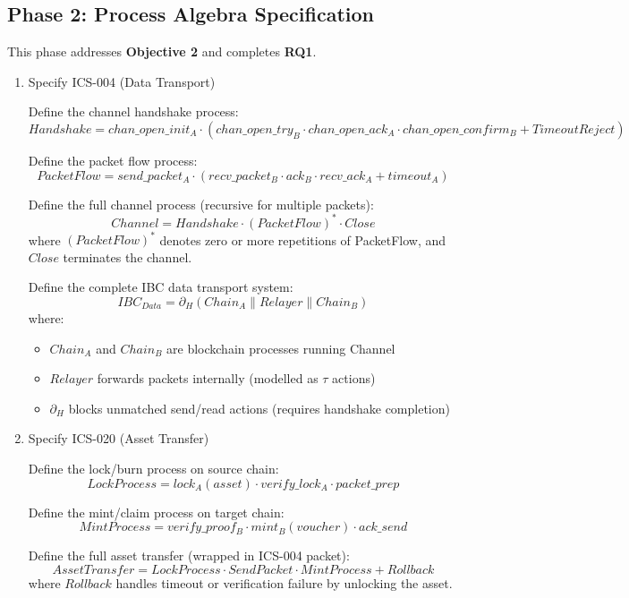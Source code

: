 \subsection{Phase 2: Process Algebra
Specification}\label{phase-2-process-algebra-specification}

This phase addresses \textbf{Objective 2} and completes \textbf{RQ1}.

\begin{enumerate}
\item
  Specify ICS-004 (Data Transport)

  Define the channel handshake process: \[
  Handshake = chan\_open\_init_{A} \cdot (chan\_open\_try_{B} \cdot chan\_open\_ack_{A} \cdot chan\_open\_confirm_{B} + TimeoutReject)
  \]

  Define the packet flow process: \[
  PacketFlow = send\_packet_{A} \cdot (recv\_packet_{B} \cdot ack_{B} \cdot recv\_ack_{A} + timeout_{A})
  \]

  Define the full channel process (recursive for multiple packets): \[
  Channel = Handshake \cdot (PacketFlow)^* \cdot Close
  \] where \((PacketFlow)^*\) denotes zero or more repetitions of
  PacketFlow, and \(Close\) terminates the channel.

  Define the complete IBC data transport system: \[
  IBC_{Data} = \partial_H( Chain_A \parallel Relayer \parallel Chain_B )
  \] where:

  \begin{itemize}
      \item \(Chain_A\) and \(Chain_B\) are blockchain processes running Channel
      \item \(Relayer\) forwards packets internally (modelled as \(\tau\) actions)
      \item \(\partial_H\) blocks unmatched send/read actions (requires handshake completion)
  \end{itemize}
\item
  Specify ICS-020 (Asset Transfer)

  Define the lock/burn process on source chain: \[
  LockProcess = lock_{A}(asset) \cdot verify\_lock_{A} \cdot packet\_prep
  \]

  Define the mint/claim process on target chain: \[
  MintProcess = verify\_proof_{B} \cdot mint_{B}(voucher) \cdot ack\_send
  \]

  Define the full asset transfer (wrapped in ICS-004 packet): \[
  AssetTransfer = LockProcess \cdot SendPacket \cdot MintProcess + Rollback
  \] where \(Rollback\) handles timeout or verification failure by
  unlocking the asset.


\end{enumerate}
